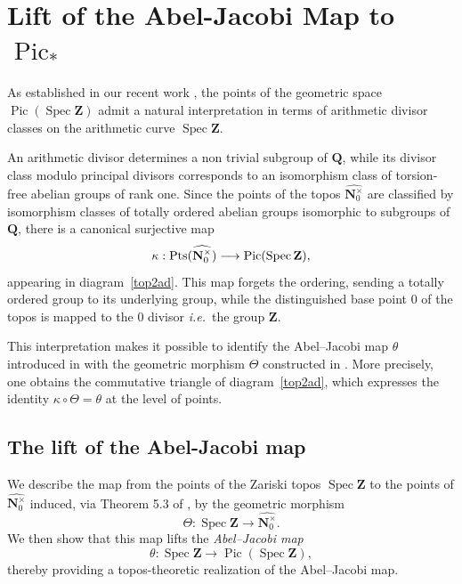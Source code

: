 \documentclass[11pt,a4paper]{article}
\newcommand{\N}{\mathbf{N}}
\newcommand{\Q}{\mathbf{Q}}
\newcommand{\Z}{\mathbf{Z}}
\def\spz{\Spec \Z}
\newcommand{\nato}{\widehat{\N^\times_0}}
\newcommand{\Pt}{{\rm Pts}}
\newcommand{\Spec}{\operatorname{Spec}}
\newcommand{\Pic}{\operatorname{Pic}} \newcommand{\Jac}{\operatorname{Jac}}
\newcommand{\picone}{{\Pic}_{*}}
\def\ie{{\it i.e.\/}\ }
\begin{document}



\section{Lift of the Abel-Jacobi Map to $\picone$}\label{abmap}

As established in our recent work \cite{CC6}, the points of the geometric space $\Pic(\spz)$ admit a natural interpretation in terms of arithmetic divisor classes on the arithmetic curve $\Spec\Z$.

An arithmetic divisor determines a non trivial subgroup of $\Q$, while its divisor class modulo principal divisors corresponds to an isomorphism class of torsion-free abelian groups of rank one. Since the points of the topos $\nato$ are classified by isomorphism classes of totally ordered abelian groups isomorphic to subgroups of $\Q$, there is a canonical surjective map
\[
\kappa:\Pt(\nato)\longrightarrow \Pic(\spz),
\]
appearing in diagram~\eqref{top2ad}. This map forgets the ordering, sending a totally ordered group to its underlying group, while the distinguished base point $0$ of the topos is mapped to the $0$ divisor \ie the group  $\Z$.\vspace{.03in}

This interpretation makes it possible to identify the Abel–Jacobi map $\theta$ introduced in \cite{CC6} with the geometric morphism $\Theta$ constructed in \cite{CC1}. More precisely, one obtains the commutative triangle of diagram~\eqref{top2ad}, which expresses the identity
$\kappa\circ\Theta=\theta$
at the level of points.

\subsection{The lift of the Abel-Jacobi map}\label{sect9.1}

We describe the map from the points of the Zariski topos $\spz$ to the points of $\nato$ induced, via Theorem 5.3 of \cite{CC1}, by the geometric morphism
\[
\Theta:\spz\longrightarrow\nato.
\]
We then show that this map lifts the \emph{Abel–Jacobi map}
\[
\theta:\Spec\Z\longrightarrow\Pic(\spz),
\]
thereby providing a topos-theoretic realization of the Abel–Jacobi map.

 
\end{document}
